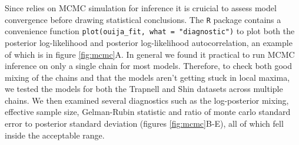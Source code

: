 Since \sname relies on MCMC simulation for inference it is cruicial to assess model convergence before drawing statistical conclusions. The \sname \texttt{R} package contains a convenience function \texttt{plot(ouija\_fit, what = "diagnostic")} to plot both the posterior log-likelihood and posterior log-likelihood autocorrelation, an example of which is in figure \ref{fig:mcmc}A. In general we found it practical to run MCMC inference on only a single chain for most models. Therefore, to check both good mixing of the chains and that the models aren't getting stuck in local maxima, we tested the models for both the Trapnell and Shin datasets across multiple chains. We then examined several diagnostics such as the log-posterior mixing, effective sample size, Gelman-Rubin statistic and ratio of monte carlo standard error to posterior standard deviation (figures \ref{fig:mcmc}B-E), all of which fell inside the acceptable range. 



